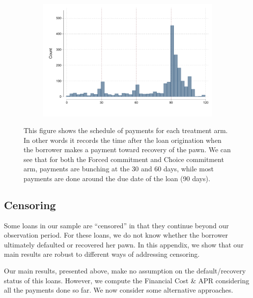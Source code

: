 \begin{figure}[H]
\begin{center}
\begin{subfigure}{0.31\textwidth}
    \includegraphics[width=\textwidth]{Figuras/hist_payments_cc.pdf}
    \end{subfigure}    
    \end{center}
     \scriptsize
     This figure shows the schedule of payments for each treatment arm. In other words it records the time after the loan origination when the borrower makes a payment toward recovery of the pawn. We can see that for both the Forced commitment and Choice commitment arm, payments are bunching at the 30 and 60 days, while most payments are done around the due date of the loan (90 days).
     
\end{figure}


\subsection{Censoring} \label{App_censoring}


\normalsize
\linespread{1.05}
\normalsize
\linespread{1.05}

Some loans in our sample are ``censored'' in that they continue beyond our observation period.
For these loans, we do not know whether the borrower ultimately defaulted or recovered her pawn.
In this appendix, we show that our main results are robust to different ways of addressing censoring.

Our main results, presented above, make no assumption on the default/recovery status of this loans. However, we compute the Financial Cost \& APR considering all the payments done so far. We now consider some alternative approaches. 


